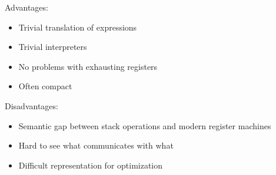 \documentclass{plt}
\begin{document}
\begin{frame}

Advantages:

\begin{itemize}
\item Trivial translation of expressions

\item Trivial interpreters

\item No problems with exhausting registers

\item Often compact
\end{itemize}

Disadvantages:

\begin{itemize}
\item Semantic gap between stack operations and modern register machines

\item Hard to see what communicates with what

\item Difficult representation for optimization
\end{itemize}

\end{frame}
\end{document}
